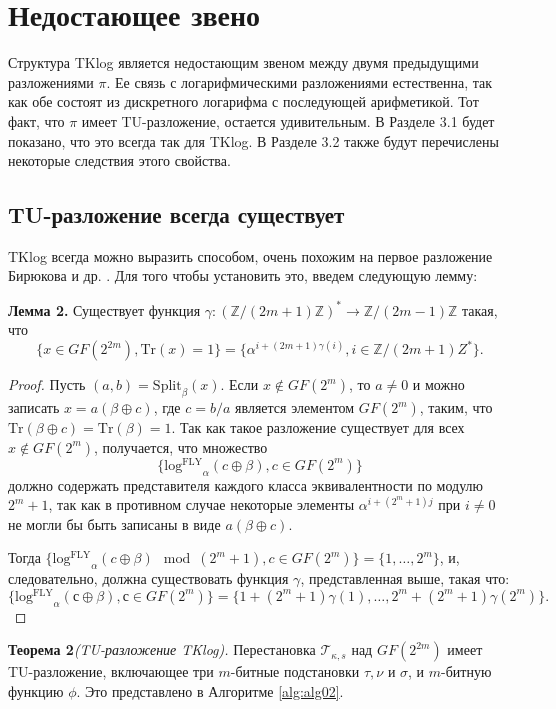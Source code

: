 \section{Недостающее звено}
Структура TKlog является недостающим звеном между двумя предыдущими разложениями \(\pi\). Ее связь с логарифмическими разложениями \cite{PU16} естественна, так как обе состоят из дискретного логарифма с последующей арифметикой. Тот факт, что \(\pi\) имеет TU-разложение, остается удивительным. В Разделе 3.1 будет показано, что это всегда так для TKlog. В Разделе 3.2 также будут перечислены некоторые следствия этого свойства.

\subsection{TU-разложение всегда существует}
TKlog всегда можно выразить способом, очень похожим на первое разложение Бирюкова и др. \cite{BPU16a}. Для того чтобы установить это, введем следующую лемму:

\textbf{Лемма 2.} Существует функция \(\gamma : (\mathbb{Z}/(2m + 1)\mathbb{Z})^* \to \mathbb{Z}/(2m - 1)\mathbb{Z}\) такая, что 
\[
\{x \in GF(2^{2m}), \mathrm{Tr}(x) = 1\} = \{\alpha^{i + (2m+1)\gamma(i)}, i \in \mathbb{Z}/(2m + 1)Z^*\}.
\]

\begin{proof}
Пусть \((a, b) = \mathrm{Split}_{\beta}(x)\). Если \(x \notin GF(2^m)\), то \(a \neq 0\) и можно записать \(x = a(\beta \oplus c)\), где \(c = b/a\) является элементом \(GF(2^m)\), таким, что \(\mathrm{Tr}(\beta \oplus c) = \mathrm{Tr}(\beta) = 1\). Так как такое разложение существует для всех \(x \notin GF(2^m)\), получается, что множество 
\[
\{\mathrm{log^{FLY}}_{\alpha}(c \oplus \beta), c \in GF(2^m)\}
\]
должно содержать представителя каждого класса эквивалентности по модулю \(2^m + 1\), так как в противном случае некоторые элементы \(\alpha^{i + (2^m+1)j}\) при \(i \neq 0\) не могли бы быть записаны в виде \(a(\beta \oplus c)\).

Тогда \(\{\mathrm{log^{FLY}}_{\alpha}(c \oplus \beta) \mod (2^m + 1), c \in GF(2^m)\} = \{1, \ldots, 2^m\}\),
и, следовательно, должна существовать функция \(\gamma\), представленная выше, такая что:
\[
\{\mathrm{log^{FLY}}_{\alpha}(с \oplus \beta), с \in GF(2^m)\} = \{1 + (2^m + 1)\gamma(1), \ldots, 2^m + (2^m + 1)\gamma(2^m)\}.
\]
\end{proof}

\textbf{Теорема 2}\textit{(TU-разложение TKlog).}
Перестановка \(\mathscr{T}_{\kappa, s}\) над \(GF(2^{2m})\) имеет TU-разложение, включающее три \(m\)-битные подстановки \(\tau, \nu\) и \(\sigma\), и \(m\)-битную функцию \(\phi\). Это представлено в Алгоритме \ref{alg:alg02}.

